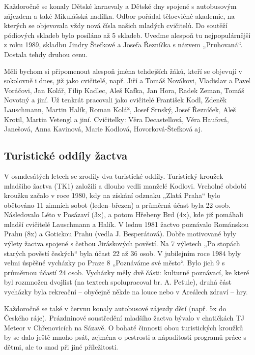 Každoročně se konaly Dětské karnevaly a Dětské dny spojené s autobusovým
zájezdem a také Mikulášská nadílka. Odbor pořádal tělocvičné akademie,
na kterých se objevovala vždy nová čísla našich mladých cvičitelů. Do
soutěží pódiových skladeb bylo posíláno až 5 skladeb. Uveďme alespoň tu
nejpopulárnější z roku 1989, skladbu Jindry Štefkové a Josefa Řezníčka s
názvem „Pruhovaná``. Dostala tehdy druhou cenu.

Měli bychom si připomenout alespoň jména tehdejších žáků, kteří se
objevují v sokolovně i dnes, již jako cvičitelé, např. Jiří a Tomáš
Novákovi, Vladislav a Pavel Voráčovi, Jan Kolář, Filip Kadlec, Aleš
Kafka, Jan Hora, Radek Zeman, Tomáš Novotný a jiní. Už tenkrát pracovali
jako cvičitelé František Kodl, Zdeněk Lauschmann, Martin Halík, Roman
Kolář, Josef Srnský, Josef Řezníček, Aleš Krotil, Martin Vetengl a jiní.
Cvičitelky: Věra Decastellová, Věra Haufová, Janešová, Anna Kavinová,
Marie Kodlová, Hovorková-Štefková aj.

\subsection{Turistické oddíly
žactva}\label{turistickuxe9-odduxedly-ux17eactva}

V osmdesátých letech se zrodily dva turistické oddíly. Turistický
kroužek mladšího žactva (TK1) založili a dlouho vedli manželé Kodlovi.
Vrcholné období kroužku začalo v roce 1980, kdy na získání odznaku
„Zlatá Praha`` bylo obětováno 11 zimních sobot (leden--březen) a
průměrná účast byla 22 osob. Následovalo Léto v Posázaví (3x), a potom
Hřebeny Brd (4x), kde již pomáhali mladší cvičitelé Lauschmann a Halík.
V lednu 1981 žactvo poznávalo Románskou Prahu (8x) a Gotickou Prahu
(vedla J. Besperátová). Dobře motivované byly výlety žactva spojené s
četbou Jiráskových pověstí. Na 7 výletech „Po stopách starých pověstí
českých`` byla účast 22 až 36 osob. V jubilejním roce 1984 byly velmi
úspěšné vycházky po Praze 8 „Poznáváme své město``. Bylo jich 9 s
průměrnou účastí 24 osob. Vycházky měly dvě části: kulturně poznávací,
ke které byl rozmnožen dvojlist (na textech spolupracoval br. A.
Peťule), druhá část vycházky byla rekreační -- obyčejně někde na louce
nebo v Areálech zdraví -- hry.

Každoročně se také v červnu konaly autobusové zájezdy dětí (např. 5x do
Českého ráje). Prázdninové soustředění mladšího žactva bývalo v
chatičkách TJ Meteor v Chřenovicích na Sázavě. O bohaté činnosti obou
turistických kroužků by se dalo ještě mnoho psát, zejména o pestrosti a
nápaditosti programů práce s dětmi, ale to snad při jiné příležitosti.

